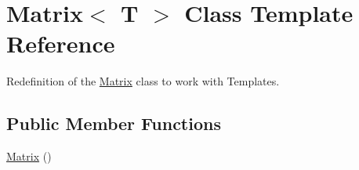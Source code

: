 \hypertarget{class_matrix}{\section{Matrix$<$ T $>$ Class Template Reference}
\label{class_matrix}
}


Redefinition of the \hyperlink{class_matrix}{Matrix} class to work with Templates.  


\subsection*{Public Member Functions}
\begin{DoxyCompactItemize}
\item 
\hypertarget{class_matrix_a9d567e3a121b1be0c3f9c461cab524fe}{\hyperlink{class_matrix_a9d567e3a121b1be0c3f9c461cab524fe}{Matrix} ()}\label{class_matrix_a9d567e3a121b1be0c3f9c461cab524fe}


\end{DoxyCompactItemize}
